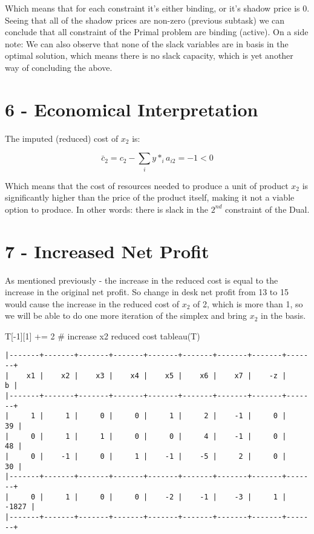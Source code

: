 \documentclass[
  letterpaper,
  DIV=11,
  numbers=noendperiod]{scrartcl}
\newenvironment{Shaded}{\begin{snugshade}}{\end{snugshade}}
\newcommand{\CommentTok}[1]{\textcolor[rgb]{0.37,0.37,0.37}{#1}}
\newcommand{\DecValTok}[1]{\textcolor[rgb]{0.68,0.00,0.00}{#1}}
\newcommand{\NormalTok}[1]{\textcolor[rgb]{0.00,0.23,0.31}{#1}}
\newcommand{\OperatorTok}[1]{\textcolor[rgb]{0.37,0.37,0.37}{#1}}
\begin{document}
Which means that for each constraint it's either binding, or it's shadow
price is \(0\). Seeing that all of the shadow prices are non-zero
(previous subtask) we can conclude that all constraint of the Primal
problem are binding (active). \newline On a side note: We can also
observe that none of the slack variables are in basis in the optimal
solution, which means there is no slack capacity, which is yet another
way of concluding the above.

\newpage

\section{6 - Economical Interpretation}\label{economical-interpretation}

The imputed (reduced) cost of \(x_2\) is:

\[
\bar{c}_2 = c_2 - \sum_{i}{y*_i a_{i2}} = -1 < 0
\]

Which means that the cost of resources needed to produce a unit of
product \(x_2\) is significantly higher than the price of the product
itself, making it not a viable option to produce. \newline In other
words: there is slack in the \(2^{nd}\) constraint of the Dual.

\newpage

\section{7 - Increased Net Profit}\label{increased-net-profit}

As mentioned previously - the increase in the reduced cost is equal to
the increase in the original net profit. So change in desk net profit
from 13 to 15 would cause the increase in the reduced cost of \(x_2\) of
2, which is more than 1, so we will be able to do one more iteration of
the simplex and bring \(x_2\) in the basis.

\begin{Shaded}
\begin{Highlighting}[]
\NormalTok{T[}\OperatorTok{{-}}\DecValTok{1}\NormalTok{][}\DecValTok{1}\NormalTok{] }\OperatorTok{+=} \DecValTok{2} \CommentTok{\# increase x2 reduced cost}
\NormalTok{tableau(T)}
\end{Highlighting}
\end{Shaded}

\begin{verbatim}
|-------+-------+-------+-------+-------+-------+-------+-------+-------+
|    x1 |    x2 |    x3 |    x4 |    x5 |    x6 |    x7 |    -z |     b |
|-------+-------+-------+-------+-------+-------+-------+-------+-------+
|     1 |     1 |     0 |     0 |     1 |     2 |    -1 |     0 |    39 |
|     0 |     1 |     1 |     0 |     0 |     4 |    -1 |     0 |    48 |
|     0 |    -1 |     0 |     1 |    -1 |    -5 |     2 |     0 |    30 |
|-------+-------+-------+-------+-------+-------+-------+-------+-------+
|     0 |     1 |     0 |     0 |    -2 |    -1 |    -3 |     1 | -1827 |
|-------+-------+-------+-------+-------+-------+-------+-------+-------+
\end{verbatim}
\end{document}
